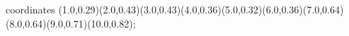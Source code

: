					coordinates { (1.0,0.29)(2.0,0.43)(3.0,0.43)(4.0,0.36)(5.0,0.32)(6.0,0.36)(7.0,0.64)(8.0,0.64)(9.0,0.71)(10.0,0.82)};